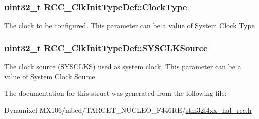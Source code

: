 \subsubsection[{\texorpdfstring{Clock\+Type}{ClockType}}]{\setlength{\rightskip}{0pt plus 5cm}uint32\+\_\+t R\+C\+C\+\_\+\+Clk\+Init\+Type\+Def\+::\+Clock\+Type}\hypertarget{struct_r_c_c___clk_init_type_def_a93a53676a1cfc5b55b8b990e7ff4dac5}{}\label{struct_r_c_c___clk_init_type_def_a93a53676a1cfc5b55b8b990e7ff4dac5}
The clock to be configured. This parameter can be a value of \hyperlink{group___r_c_c___system___clock___type}{System Clock Type} 
\subsubsection[{\texorpdfstring{S\+Y\+S\+C\+L\+K\+Source}{SYSCLKSource}}]{\setlength{\rightskip}{0pt plus 5cm}uint32\+\_\+t R\+C\+C\+\_\+\+Clk\+Init\+Type\+Def\+::\+S\+Y\+S\+C\+L\+K\+Source}\hypertarget{struct_r_c_c___clk_init_type_def_a4ceff1fdbf423e347c63052ca2c1d7e1}{}\label{struct_r_c_c___clk_init_type_def_a4ceff1fdbf423e347c63052ca2c1d7e1}
The clock source (S\+Y\+S\+C\+L\+KS) used as system clock. This parameter can be a value of \hyperlink{group___r_c_c___system___clock___source}{System Clock Source} 

The documentation for this struct was generated from the following file\+:\begin{DoxyCompactItemize}
\item 
Dynamixel-\/\+M\+X106/mbed/\+T\+A\+R\+G\+E\+T\+\_\+\+N\+U\+C\+L\+E\+O\+\_\+\+F446\+R\+E/\hyperlink{stm32f4xx__hal__rcc_8h}{stm32f4xx\+\_\+hal\+\_\+rcc.\+h}\end{DoxyCompactItemize}
